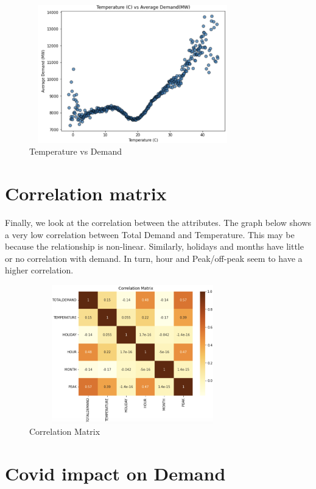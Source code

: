 \documentclass[mstat,12pt]{unswthesis}
\begin{document}
\begin{figure}[H]
\centering
\includegraphics[width=0.80\textwidth,height=6cm]{temperature_demand.png}
\caption{Temperature vs Demand}
\label{temperature_demand}
\end{figure}

\section{Correlation matrix}\label{correlation-matrix}

Finally, we look at the correlation between the attributes. The graph
below shows a very low correlation between Total Demand and Temperature.
This may be because the relationship is non-linear. Similarly, holidays
and months have little or no correlation with demand. In turn, hour and
Peak/off-peak seem to have a higher correlation.

\begin{figure}[H]
\centering
\includegraphics[width=0.80\textwidth,height=6cm]{correlation_matrix.png}
\caption{Correlation Matrix}
\label{correlation_matrix}
\end{figure}

\section{Covid impact on Demand}\label{covid-impact-on-demand}
\end{document}
